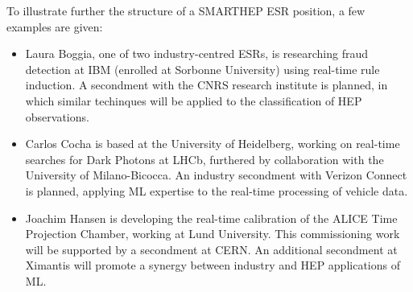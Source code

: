 To illustrate further the structure of a SMARTHEP ESR position, a few examples are given:
\begin{itemize}
    \item  Laura Boggia, one of two industry-centred ESRs, is researching fraud detection at IBM (enrolled at Sorbonne University) using real-time rule induction. A secondment with the CNRS research institute is planned, in which similar techinques will be applied to the classification of HEP observations. 
    \item Carlos Cocha is based at the University of Heidelberg, working on real-time searches for Dark Photons at LHCb, furthered by collaboration with the University of Milano-Bicocca. An industry secondment with Verizon Connect is planned, applying ML expertise to the real-time processing of vehicle data.
    \item Joachim Hansen is developing the real-time calibration of the ALICE Time Projection Chamber, working at Lund University. This commissioning work will be supported by a secondment at CERN. An additional secondment at Ximantis will promote a synergy between industry and HEP applications of ML.
\end{itemize}